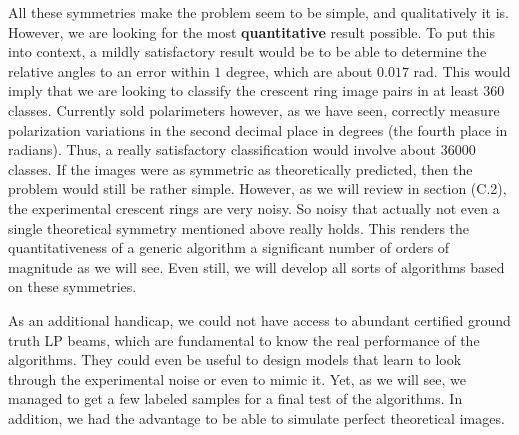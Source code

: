 \documentclass[11pt, a4paper, twoside]{article} %
\begin{document}
All these symmetries make the problem seem to be simple, and qualitatively it is. However, we are looking for the most {\bf quantitative} result possible. To put this into context, a mildly satisfactory result would be to be able to determine the relative angles to an error within $1$ degree, which are about $0.017$ rad. This would imply that we are looking to classify the crescent ring image pairs in at least 360 classes. Currently sold polarimeters however, as we have seen, correctly measure polarization variations in the second decimal place in degrees (the fourth place in radians). Thus, a really satisfactory classification would involve about 36000 classes. If the images were as symmetric as theoretically predicted, then the problem would still be rather simple. However, as we will review in section (C.2), the experimental crescent rings are very noisy. So noisy that actually not even a single theoretical symmetry mentioned above really holds. This renders the quantitativeness of a generic algorithm a significant number of orders of magnitude as we will see. Even still, we will develop all sorts of algorithms based on these symmetries.

As an additional handicap, we could not have access to abundant certified ground truth LP beams, which are fundamental to know the real performance of the algorithms. They could even be useful to design models that learn to look through the experimental noise or even to mimic it. Yet, as we will see, we managed to get a few labeled samples for a final test of the algorithms. In addition, we had the advantage to be able to simulate perfect theoretical images.

\vspace{-0.3cm}
\end{document}
